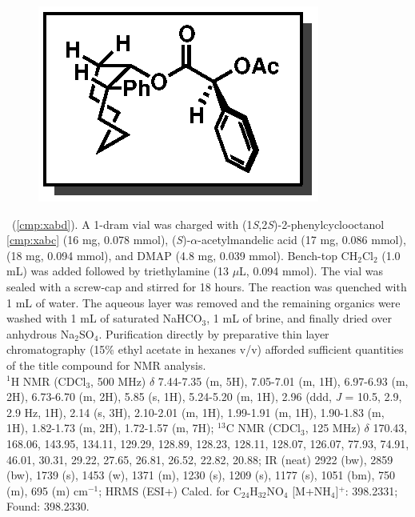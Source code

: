 \vspace{10pt}
\begin{figure}
  \vspace{-22pt}
  \begin{center}
    \includegraphics[scale=0.8]{chp_asymmetric/images/xabd}
  \end{center}
  \vspace{-25pt}
\end{figure}\noindent \textbf{\CMPxabd}\ (\ref{cmp:xabd}). A 1-dram vial was
charged with (1\textit{S},2\textit{S})-2-phenylcyclooctanol \ref{cmp:xabc} (16
mg, 0.078 mmol), (\textit{S})-$\alpha$-acetylmandelic acid (17 mg, 0.086 mmol),
 (18 mg, 0.094 mmol), and DMAP (4.8 mg, 0.039 mmol). Bench-top
CH$_2$Cl$_2$ (1.0 mL) was added followed by triethylamine (13 $\mu$L, 0.094
mmol). The vial was sealed with a screw-cap and stirred for 18 hours. The
reaction was quenched with 1 mL of water. The aqueous layer was removed and the
remaining organics were washed with 1 mL of saturated NaHCO$_3$, 1 mL of brine,
and finally dried over anhydrous Na$_2$SO$_4$. Purification directly by preparative thin layer chromatography (15\% ethyl acetate in hexanes v/v) afforded sufficient quantities of the title compound for NMR analysis.\\
$^1$H NMR (CDCl$_3$, 500 MHz) $\delta$ 7.44-7.35 (m, 5H), 7.05-7.01 (m, 1H),
6.97-6.93 (m, 2H), 6.73-6.70 (m, 2H), 5.85 (s, 1H), 5.24-5.20 (m, 1H), 2.96
(ddd, \textit{J} = 10.5, 2.9, 2.9 Hz, 1H), 2.14 (s, 3H), 2.10-2.01 (m, 1H),
1.99-1.91 (m, 1H), 1.90-1.83 (m, 1H), 1.82-1.73 (m, 2H), 1.72-1.57 (m, 7H);
$^{13}$C NMR (CDCl$_3$, 125 MHz) $\delta$ 170.43, 168.06, 143.95, 134.11,
129.29, 128.89, 128.23, 128.11, 128.07, 126.07, 77.93, 74.91, 46.01, 30.31,
29.22, 27.65, 26.81, 26.52, 22.82, 20.88; IR (neat) 2922 (bw), 2859 (bw), 1739 (s), 1453 (w), 1371 (m), 1230 (s), 1209 (s), 1177 (s), 1051 (bm), 750 (m), 695 (m) cm$^{-1}$; HRMS (ESI+) Calcd. for C$_{24}$H$_{32}$NO$_4$ [M+NH$_4$]$^+$: 398.2331; Found: 398.2330.


